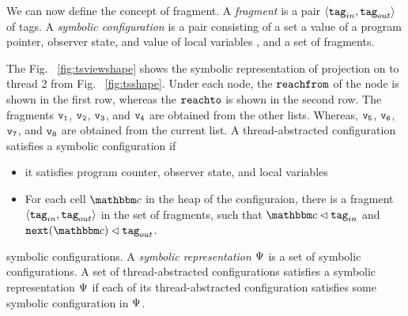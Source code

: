 We can now define the concept of fragment.
A {\em fragment} is a pair $\left\langle\mathtt{tag}_{in},\mathtt{tag}_{out}\right\rangle$ of tags.
A {\em symbolic configuration} is a pair consisting of a set a value of a program
pointer, observer state, and value of local variables , and a set of fragments.

The Fig. ~\ref{fig:tsviewshape} shows the symbolic representation of projection on to thread 2 from Fig. ~\ref{fig:tsshape}. Under each node, the $\mathtt{reachfrom}$ of the node is shown in the first row, whereas the $\mathtt{reachto}$ is shown in the second row. The fragments $\tt v_1$, $\tt v_2$, $\tt v_3$, and $\tt v_4$ are obtained from the other lists. Whereas, $\tt v_5$, $\tt v_6$, $\tt v_7$, and $\tt v_8$ are obtained from the current list.   
A thread-abstracted configuration satisfies a symbolic configuration if
\begin{itemize}
\item it satisfies program counter, observer state, and local variables %
\item
  For each cell $\cell$ in the heap of the configuraion, there is
  a fragment $\left\langle\mathtt{tag}_{in},\mathtt{tag}_{out}\right\rangle$ in the set of fragments, such
  that $\cell \lhd \inputtag$ and ${\tt next}(\cell) \lhd \outputtag$.
\end{itemize}

symbolic configurations. 
A {\em symbolic representation} $\Psi$ is a set of
symbolic configurations. 
A  set of thread-abstracted configurations satisfies a symbolic
representation $\Psi$ if each of its thread-abstracted
configuration satisfies some symbolic configuration in $\Psi$.





